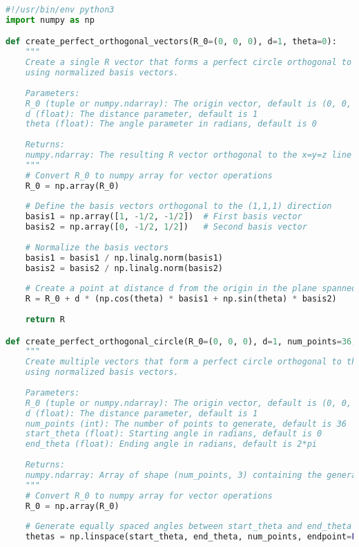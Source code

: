 \begin{lstlisting}[language=Python]
#!/usr/bin/env python3
import numpy as np

def create_perfect_orthogonal_vectors(R_0=(0, 0, 0), d=1, theta=0):
    """
    Create a single R vector that forms a perfect circle orthogonal to the x=y=z line
    using normalized basis vectors.
    
    Parameters:
    R_0 (tuple or numpy.ndarray): The origin vector, default is (0, 0, 0)
    d (float): The distance parameter, default is 1
    theta (float): The angle parameter in radians, default is 0
    
    Returns:
    numpy.ndarray: The resulting R vector orthogonal to the x=y=z line
    """
    # Convert R_0 to numpy array for vector operations
    R_0 = np.array(R_0)
    
    # Define the basis vectors orthogonal to the (1,1,1) direction
    basis1 = np.array([1, -1/2, -1/2])  # First basis vector
    basis2 = np.array([0, -1/2, 1/2])   # Second basis vector
    
    # Normalize the basis vectors
    basis1 = basis1 / np.linalg.norm(basis1)
    basis2 = basis2 / np.linalg.norm(basis2)
    
    # Create a point at distance d from the origin in the plane spanned by basis1 and basis2
    R = R_0 + d * (np.cos(theta) * basis1 + np.sin(theta) * basis2)
    
    return R

def create_perfect_orthogonal_circle(R_0=(0, 0, 0), d=1, num_points=36, start_theta=0, end_theta=2*np.pi):
    """
    Create multiple vectors that form a perfect circle orthogonal to the x=y=z line
    using normalized basis vectors.
    
    Parameters:
    R_0 (tuple or numpy.ndarray): The origin vector, default is (0, 0, 0)
    d (float): The distance parameter, default is 1
    num_points (int): The number of points to generate, default is 36
    start_theta (float): Starting angle in radians, default is 0
    end_theta (float): Ending angle in radians, default is 2*pi
    
    Returns:
    numpy.ndarray: Array of shape (num_points, 3) containing the generated vectors
    """
    # Convert R_0 to numpy array for vector operations
    R_0 = np.array(R_0)
    
    # Generate equally spaced angles between start_theta and end_theta
    thetas = np.linspace(start_theta, end_theta, num_points, endpoint=False)
    

\end{lstlisting}
